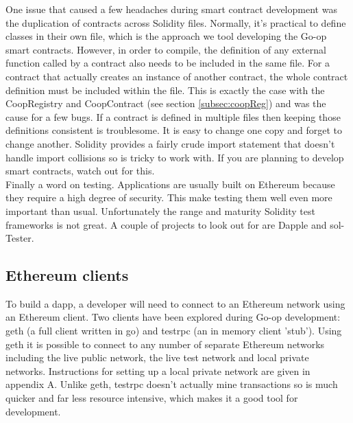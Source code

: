 One issue that caused a few headaches during smart contract development was the duplication of contracts across Solidity files. Normally, it's practical to define classes in their own file, which is the approach we tool developing the Go-op smart contracts. However, in order to compile, the definition of any external function called by a contract also needs to be included in the same file. For a contract that actually creates an instance of another contract, the whole contract definition must be included within the file. This is exactly the case with the CoopRegistry and CoopContract (see section \ref{subsec:coopReg}) and was the cause for a few bugs. If a contract is defined in multiple files then keeping those definitions consistent is troublesome. It is easy to change one copy and forget to change another. Solidity provides a fairly crude import statement that doesn't handle import collisions so is tricky to work with. If you are planning to develop smart contracts, watch out for this.\\

Finally a word on testing. Applications are usually built on Ethereum because they require a high degree of security. This make testing them well even more important than usual. Unfortunately the range and maturity Solidity test frameworks is not great. A couple of projects to look out for are Dapple\cite{dapple} and sol-Tester\cite{SolTester}. \\


\subsection{Ethereum clients}
To build a dapp, a developer will need to connect to an Ethereum network using an Ethereum client. Two clients have been explored during Go-op development: geth (a full client written in go) and testrpc (an in memory client 'stub'). Using geth it is possible to connect to any number of separate Ethereum networks including the live public network, the live test network and local private networks. Instructions for setting up a local private network are given in appendix A. Unlike geth, testrpc doesn't actually mine transactions so is much quicker and far less resource intensive, which makes it a good tool for development.\\

